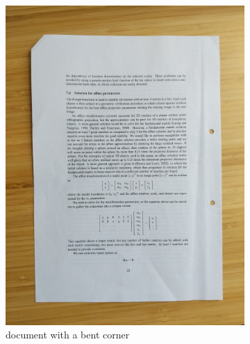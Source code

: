 \documentclass[bibliography=totoc]{scrartcl}
\begin{document}
\begin{figure}[H]
\begin{subfigure}[t]{0.3\linewidth}
		\includegraphics[width=\linewidth]{imgs/not_working/bent_corner.jpg}
		\caption{document with a bent corner}
	\end{subfigure}
	\hspace{0.02\textwidth}
	\begin{subfigure}[t]{0.3\linewidth}

\end{subfigure}
\end{figure}
\end{document}
